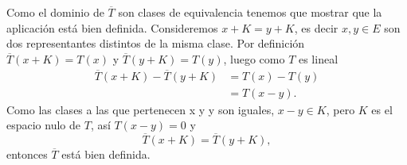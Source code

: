 \begin{itemize}
    \begin{sproof}
        Como el dominio de $\overline{T}$ son clases de equivalencia tenemos que mostrar que la aplicación está bien definida. Consideremos $x+K=y+K$, es decir $x,y\in E$ son dos representantes distintos de la misma clase. Por definición $\overline{T}(x+K)=T(x)$ y $\overline{T}(y+K)=T(y)$, luego como $T$ es lineal
        \begin{align*}
            \overline{T}(x+K)-\overline{T}(y+K)&=T(x)-T(y)\\
            &=T(x-y).
        \end{align*}
        Como las clases a las que pertenecen x y y son iguales,  $x-y\in K$, pero $K$ es el espacio nulo de $T$, así $T(x-y)=0$ y
        $$\overline{T}(x+K)=\overline{T}(y+K),$$
        entonces $\overline{T}$ está bien definida. 



\end{sproof}
\end{itemize}
